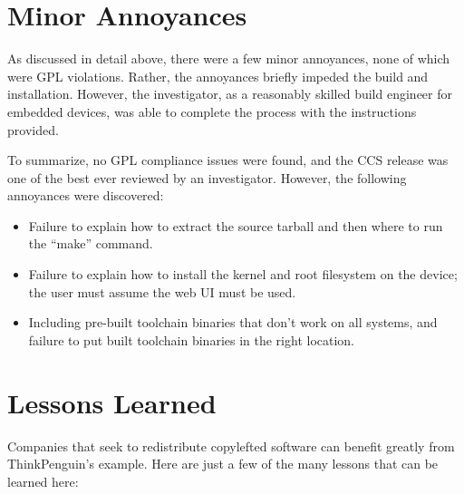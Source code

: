 \section{Minor Annoyances}

As discussed in detail above, there were a few minor annoyances, none of
which were GPL violations.  Rather, the annoyances briefly impeded the
build and installation.  However, the investigator, as a reasonably skilled
build engineer for embedded devices, was able to complete the process with
the instructions provided.

To summarize, no GPL compliance issues were found, and the CCS release was
one of the best ever reviewed by an investigator.  However, the following
annoyances were discovered:

\begin{itemize}
\item Failure to explain how to extract the source tarball and then where to run the
  ``make'' command.
\item Failure to explain how to install the kernel and root filesystem on the
  device; the user must assume the web UI must be used.

\item Including pre-built toolchain binaries that don't work on all systems,
  and failure to put built toolchain binaries in the right location.
\end{itemize}

\section{Lessons Learned}

Companies that seek to redistribute copylefted software can benefit greatly
from ThinkPenguin's example.  Here are just a few of the many lessons that
can be learned here:

